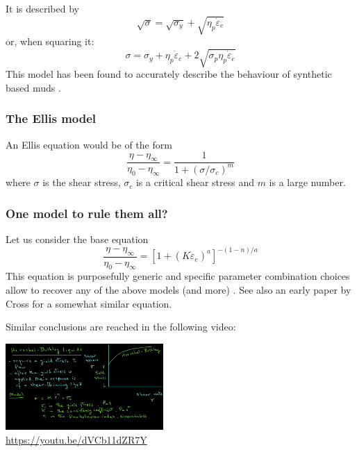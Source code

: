 It is described by \cite{barn99} 
\[
\sqrt{\sigma} = \sqrt{\sigma_y} + \sqrt{\eta_p \dot{\varepsilon}_e} 
\]
or, when squaring it:
\[
\sigma = \sigma_y + \eta_p \dot{\varepsilon}_e + 2\sqrt{\sigma_p \eta_p \dot{\varepsilon}_e} 
\]
This model has been found to accurately describe the behaviour of synthetic based muds \cite{adlo17}. 


\subsubsection{The Ellis model\label{ss:ellis}}

An Ellis equation would be of the form \cite{robc01} 
\[
\frac{\eta-\eta_\infty}{\eta_0-\eta_\infty} =
\frac{1}{1+(\sigma/\sigma_c)^m}
\]
where $\sigma$ is the shear stress, $\sigma_c$ is a critical shear stress
and $m$ is a large number. 



\subsubsection{One model to rule them all? \label{ss:cross}}

Let us consider the base equation
\[
\frac{\eta-\eta_\infty}{\eta_0-\eta_\infty} = 
\left[ 1+(K \dot{\varepsilon}_e)^a  \right]^{-(1-n)/a}
\]
This equation is purposefully generic and specific parameter combination choices 
allow to recover any of the above models (and more) \cite{osru14}.
See also an early paper by Cross \cite{cros65} for a somewhat similar equation. 

Similar conclusions are reached in the following video:
\begin{center}
\includegraphics[width=6cm]{images/rheology/hbyoutube}\\
{\captionfont \url{https://youtu.be/dVCb11dZR7Y}}
\end{center}



